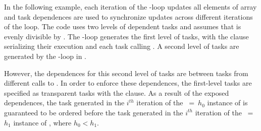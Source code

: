 In the following example,
each iteration of the -loop updates all
elements of array  and task dependences are used to synchronize
updates across different iterations of the loop. The code uses two levels of
dependent tasks and assumes that
 is evenly divisible by .
The -loop generates the first level of tasks, with
the  clause serializing their execution and each task calling
. A second level of tasks are generated by the -loop in
.

However, the dependences for this second level of tasks are between tasks from
different calls to . In order to enforce these dependences, the
first-level tasks are specified as transparent tasks with the
 clause.  As a result of the exposed
dependences, the task generated in the $i^{th}$ iteration of the
~=~$h_0$ instance of  is guaranteed to be ordered before
the task generated in the $i^{th}$ iteration of the ~=~$h_1$ instance of
, where $h_0 < h_1$.


